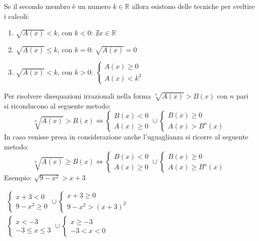 \documentclass[a4paper]{article}
\theoremstyle{plain}
\theoremstyle{definition}
\theoremstyle{remark}
\newcommand{\R}{\mathbb{R}}
\begin{document}
Se il secondo membro è un numero $k\in\R$ allora esistono delle tecniche per sveltire i calcoli:
\begin{enumerate}
    \item $\sqrt{A(x)}<k$, con $k<0$: $\nexists x\in\R$
    \item $\sqrt{A(x)}\leq k$, con $k=0$: $\sqrt{A(x)}=0$
    \item $\sqrt{A(x)}<k$, con $k>0$: $\begin{cases}
        A(x)\geq0\\
        A(x)<k^2
    \end{cases}$
\end{enumerate}
Per risolvere disequazioni irrazionali nella forma $\sqrt[n]{A(x)}>B(x)$ con $n$ pari si riconducono al seguente metodo:
\begin{equation}
    \sqrt[n]{A(x)}>B(x)\iff\begin{cases}
        B(x)<0\\
        A(x)\geq0
    \end{cases}\cup\begin{cases}
        B(x)\geq0\\
        A(x)>B^n(x)
    \end{cases}
\end{equation}
In caso venisse presa in considerazione anche l'uguaglianza si ricorre al seguente metodo:
\begin{equation}
    \sqrt[n]{A(x)}\geq B(x)\iff\begin{cases}
        B(x)<0\\
        A(x)\geq0
    \end{cases}\cup\begin{cases}
        B(x)\geq0\\
        A(x)\geq B^n(x)
    \end{cases}
\end{equation}
Esempio: $\sqrt{9-x^2}>x+3$

$\begin{array}{l}
   \begin{cases}
        x+3<0\\
        9-x^2\geq0
   \end{cases}\cup\begin{cases}
       x+3\geq0\\
       9-x^2>(x+3)^2
   \end{cases}\\
   \begin{cases}
       x<-3\\
       -3\leq x\leq3
   \end{cases}\cup\begin{cases}
       x\geq-3\\
       -3<x<0
   \end{cases}
\end{array}$
\end{document}
